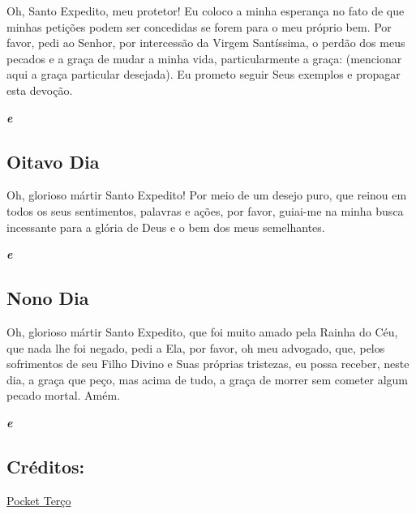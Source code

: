 \documentclass[18pt]{article}
\begin{document}
\begin{justify}
Oh, Santo Expedito, meu protetor! Eu coloco a minha esperança no fato de que minhas petições podem ser concedidas se forem para o meu próprio bem. Por favor, pedi ao Senhor, por intercessão da Virgem Santíssima, o perdão dos meus pecados e a graça de mudar a minha vida, particularmente a graça: (mencionar aqui a graça particular desejada). Eu prometo seguir Seus exemplos e propagar esta devoção.

\textbf{\textit{ e }} %

\subsection*{Oitavo Dia}

\textbf{\textit{}} %

Oh, glorioso mártir Santo Expedito! Por meio de um desejo puro, que reinou em todos os seus sentimentos, palavras e ações, por favor, guiai-me na minha busca incessante para a glória de Deus e o bem dos meus semelhantes.

\textbf{\textit{ e }} %

\subsection*{Nono Dia}

\textbf{\textit{}} %

Oh, glorioso mártir Santo Expedito, que foi muito amado pela Rainha do Céu, que nada lhe foi negado, pedi a Ela, por favor, oh meu advogado, que, pelos sofrimentos de seu Filho Divino e Suas próprias tristezas, eu possa receber, neste dia, a graça que peço, mas acima de tudo, a graça de morrer sem cometer algum pecado mortal. Amém.

\textbf{\textit{ e }} %



\centering

\vfill
\subsection*{Créditos:}
\href{https://pocketterco.com.br/index.php/terco/novena-a-santo-expedito-inicia-em-10-de-abril}{Pocket Terço}


\end{justify}
\end{document}
